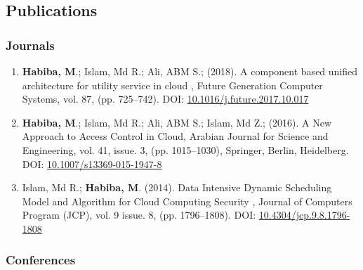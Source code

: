 \documentclass[12pt,parskip=half]{scrartcl}
\begin{document}
\subsection{Publications}\label{publications}

\subsubsection{Journals}\label{journals}

\begin{enumerate}
  \leftskip-0.13in %
  \item \textbf{Habiba, M}.; Islam, Md R.; Ali, ABM S.; (2018). A component based unified architecture for utility service in cloud , Future Generation Computer Systems, vol. 87, (pp. 725--742). DOI: \href{https://doi.org/10.1016/j.future.2017.10.017}{10.1016/j.future.2017.10.017}
  \item \textbf{Habiba, M}.;  Islam, Md R.;  Ali, ABM S.; Islam, Md Z.; (2016). A New Approach to Access Control in Cloud,  Arabian Journal for Science and Engineering, vol. 41, issue. 3, (pp. 1015--1030), Springer, Berlin, Heidelberg. DOI: \href{https://doi.org/10.1007/s13369-015-1947-8}{10.1007/s13369-015-1947-8}
  
   \item Islam, Md R.;  \textbf{Habiba, M}. (2014). Data Intensive Dynamic Scheduling Model and Algorithm for Cloud Computing Security , Journal of Computers Program (JCP), vol. 9 issue. 8, (pp. 1796--1808). DOI: \href{https://doi.org/10.4304/jcp.9.8.1796-1808 }{10.4304/jcp.9.8.1796-1808 }
\end{enumerate}

\subsubsection{Conferences}\label{conferences}
\end{document}
